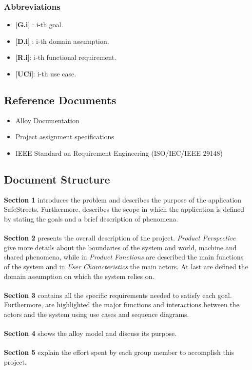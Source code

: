     \subsubsection{Abbreviations}
        \begin{itemize}
            \item {[\textbf{G.i}]} : i-th goal.
            \item {[\textbf{D.i}]} : i-th domain assumption.
            \item {[\textbf{R.i}]}: i-th functional requirement.
            \item {[\textbf{UCi}]}: i-th use case.
        \end{itemize}
    


\subsection{Reference
Documents}
    \begin{itemize}
        \item Alloy Documentation
        \item Project assignment specifications
        \item IEEE Standard on Requirement Engineering (ISO/IEC/IEEE 29148) 
    \end{itemize}

\subsection{Document
Structure}

\textbf{Section 1} introduces the problem and describes the purpose of the application SafeStreets. Furthermore, describes the scope in which the application is defined by stating the goals and a brief description of phenomena.\\\\
\textbf{Section 2} presents the overall description of the project. \textit{Product Perspective} give more details about the boundaries of the system and world, machine and shared phenomena, while in \textit{Product Functions} are described the main functions of the system and in \textit{User Characteristics} the main actors. At last are defined the domain assumption on which the system relies on.\\\\
\textbf{Section 3} contains all the specific requirements needed to satisfy each goal. Furthermore, are highlighted the major functions and interactions between the actors and the system using use cases and sequence diagrams.\\\\
\textbf{Section 4} shows the alloy model and discuss its purpose.\\\\
\textbf{Section 5} explain the effort spent by each group member to accomplish this project.\\
